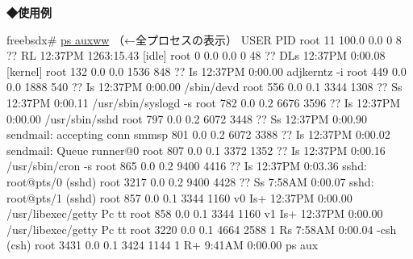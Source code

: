 \noindent
{\bf ◆使用例}
\begin{cli}
freebsdx# \underline{ps auxww} （←全プロセスの表示）
USER    PID %
root     11 100.0  0.0     0     8  ??  RL   12:37PM 1263:15.43 [idle]
root      0  0.0  0.0     0    48  ??  DLs  12:37PM   0:00.08 [kernel]
root    132  0.0  0.0  1536   848  ??  Is   12:37PM   0:00.00 adjkerntz -i
root    449  0.0  0.0  1888   540  ??  Is   12:37PM   0:00.00 /sbin/devd
root    556  0.0  0.1  3344  1308  ??  Ss   12:37PM   0:00.11 /usr/sbin/syslogd -s
root    782  0.0  0.2  6676  3596  ??  Is   12:37PM   0:00.00 /usr/sbin/sshd
root    797  0.0  0.2  6072  3448  ??  Ss   12:37PM   0:00.90 sendmail: accepting conn
smmsp   801  0.0  0.2  6072  3388  ??  Is   12:37PM   0:00.02 sendmail: Queue runner@0
root    807  0.0  0.1  3372  1352  ??  Is   12:37PM   0:00.16 /usr/sbin/cron -s
root    865  0.0  0.2  9400  4416  ??  Is   12:37PM   0:03.36 sshd: root@pts/0 (sshd)
root   3217  0.0  0.2  9400  4428  ??  Ss    7:58AM   0:00.07 sshd: root@pts/1 (sshd)
root    857  0.0  0.1  3344  1160  v0  Is+  12:37PM   0:00.00 /usr/libexec/getty Pc tt
root    858  0.0  0.1  3344  1160  v1  Is+  12:37PM   0:00.00 /usr/libexec/getty Pc tt
root   3220  0.0  0.1  4664  2588   1  Rs    7:58AM   0:00.04 -csh (csh)
root   3431  0.0  0.1  3424  1144   1  R+    9:41AM   0:00.00 ps aux
\end{cli}
\clearpage
